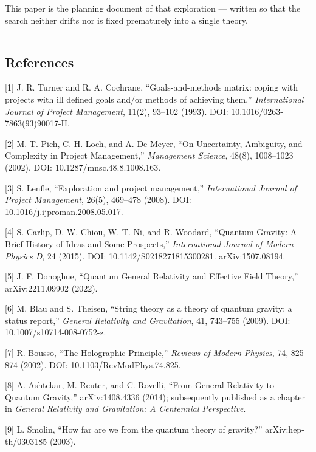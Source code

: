 \documentclass[
  a4paper,
]{article}
\begin{document}
This paper is the planning document of that exploration --- written so
that the search neither drifts nor is fixed prematurely into a single
theory.

\begin{center}\rule{0.5\linewidth}{0.5pt}\end{center}

\subsection{References}\label{references}

{[}1{]} J. R. Turner and R. A. Cochrane, ``Goals-and-methods matrix:
coping with projects with ill defined goals and/or methods of achieving
them,'' \emph{International Journal of Project Management}, 11(2),
93--102 (1993). DOI: 10.1016/0263-7863(93)90017-H.

{[}2{]} M. T. Pich, C. H. Loch, and A. De Meyer, ``On Uncertainty,
Ambiguity, and Complexity in Project Management,'' \emph{Management
Science}, 48(8), 1008--1023 (2002). DOI: 10.1287/mnsc.48.8.1008.163.

{[}3{]} S. Lenfle, ``Exploration and project management,''
\emph{International Journal of Project Management}, 26(5), 469--478
(2008). DOI: 10.1016/j.ijproman.2008.05.017.

{[}4{]} S. Carlip, D.-W. Chiou, W.-T. Ni, and R. Woodard, ``Quantum
Gravity: A Brief History of Ideas and Some Prospects,''
\emph{International Journal of Modern Physics D}, 24 (2015). DOI:
10.1142/S0218271815300281. arXiv:1507.08194.

{[}5{]} J. F. Donoghue, ``Quantum General Relativity and Effective Field
Theory,'' arXiv:2211.09902 (2022).

{[}6{]} M. Blau and S. Theisen, ``String theory as a theory of quantum
gravity: a status report,'' \emph{General Relativity and Gravitation},
41, 743--755 (2009). DOI: 10.1007/s10714-008-0752-z.

{[}7{]} R. Bousso, ``The Holographic Principle,'' \emph{Reviews of
Modern Physics}, 74, 825--874 (2002). DOI: 10.1103/RevModPhys.74.825.

{[}8{]} A. Ashtekar, M. Reuter, and C. Rovelli, ``From General
Relativity to Quantum Gravity,'' arXiv:1408.4336 (2014); subsequently
published as a chapter in \emph{General Relativity and Gravitation: A
Centennial Perspective}.

{[}9{]} L. Smolin, ``How far are we from the quantum theory of
gravity?'' arXiv:hep-th/0303185 (2003).
\end{document}

